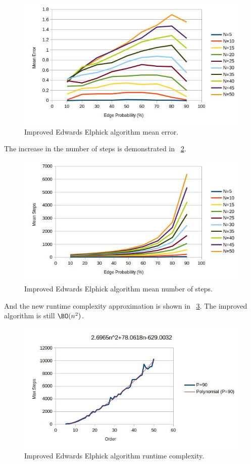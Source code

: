 \begin{figure}[H]
  \centering
  \includegraphics[width=5in]{edwards2_error}
  \caption{Improved Edwards Elphick algorithm mean error.}
  \label{fig:edwards2:error}
\end{figure}

The increase in the number of steps is demonstrated in \figurename~\ref{fig:edwards2:steps}.

\begin{figure}[H]
  \centering
  \includegraphics[width=5in]{edwards2_steps}
  \caption{Improved Edwards Elphick algorithm mean number of steps.}
  \label{fig:edwards2:steps}
\end{figure}

And the new runtime complexity approximation is shown in \figurename~\ref{fig:edwards2:runtime}.  The improved
algorithm is still \(\BO(n^2)\).

\begin{figure}[H]
  \centering
  \includegraphics[width=5in]{edwards2_runtime}
  \caption{Improved Edwards Elphick algorithm runtime complexity.}
  \label{fig:edwards2:runtime}
\end{figure}

